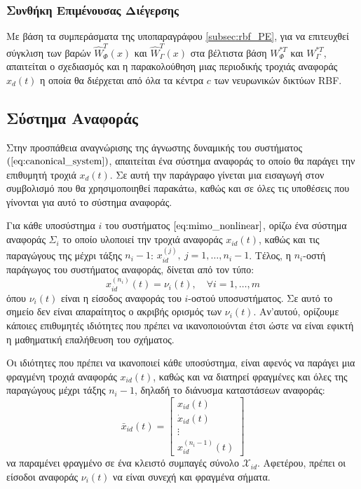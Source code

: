\subsubsection{Συνθήκη Επιμένουσας Διέγερσης}
Με βάση τα συμπεράσματα της υποπαραγράφου \ref{subsec:rbf_PE}, για να επιτευχθεί σύγκλιση των βαρών $\hat{W}_{\varPhi}^{T}(x)$ και $\hat{W}_{\Gamma}^{T}(x)$ στα βέλτιστα βάση $W_{\varPhi}^{*T}$ και $W_{\Gamma}^{*T}$, απαιτείται ο σχεδιασμός και η παρακολούθηση μιας περιοδικής τροχιάς αναφοράς $x_d(t)$ η οποία θα διέρχεται από όλα τα κέντρα $c$ των νευρωνικών δικτύων RBF.

\subsection{Σύστημα Αναφοράς} \label{subsec:schema_ref}
Στην προσπάθεια αναγνώρισης της άγνωστης δυναμικής του συστήματος $(\ref{eq:canonical_system})$, απαιτείται ένα σύστημα αναφοράς το οποίο θα παράγει την επιθυμητή τροχιά $x_d(t)$. Σε αυτή την παράγραφο γίνεται μια εισαγωγή στον συμβολισμό που θα χρησιμοποιηθεί παρακάτω, καθώς και σε όλες τις υποθέσεις που γίνονται για αυτό το σύστημα αναφοράς. 


Για κάθε υποσύστημα $i$ του συστήματος $\ref{eq:mimo_nonlinear}$, ορίζω ένα σύστημα αναφοράς $\Sigma_i$ το οποίο υλοποιεί την τροχιά αναφοράς $x_{id}(t)$, καθώς και τις παραγώγους της μέχρι τάξης $n_i-1$: $x_{id}^{(j)},\: j = 1,\dots,n_i-1$. Τέλος, η $n_i$-οστή παράγωγος του συστήματος αναφοράς, δίνεται από τον τύπο:
\begin{equation}
	x_{id}^{(n_i)}(t) = \nu_i(t), \quad \forall i = 1,\dots,m
\end{equation}
όπου $\nu_i(t)$ είναι η είσοδος αναφοράς του $i$-οστού υποσυστήματος. Σε αυτό το σημείο δεν είναι απαραίτητος ο ακριβής ορισμός των $\nu_i(t)$. Αν'αυτού, ορίζουμε κάποιες επιθυμητές ιδιότητες που πρέπει να ικανοποιούνται έτσι ώστε να είναι εφικτή η μαθηματική επαλήθευση του σχήματος.

Οι ιδιότητες που πρέπει να ικανοποιεί κάθε υποσύστημα, είναι αφενός να παράγει μια φραγμένη τροχιά αναφοράς $x_{id}(t)$, καθώς και να διατηρεί φραγμένες και όλες της παραγώγους μέχρι τάξης $n_i - 1$, δηλαδή το διάνυσμα καταστάσεων αναφοράς:
\begin{equation*}
	\bar{x}_{id}(t) = 
	\begin{bmatrix}
	x_{id}(t) \\ \dot{x}_{id}(t) \\ \vdots \\ x_{id}^{(n_i-1)}(t)
	\end{bmatrix}
\end{equation*}
να παραμένει φραγμένο σε ένα κλειστό συμπαγές σύνολο $\mathcal{X}_{id}$. Αφετέρου, πρέπει οι είσοδοι αναφοράς $\nu_i(t)$ να είναι συνεχή και φραγμένα σήματα.


